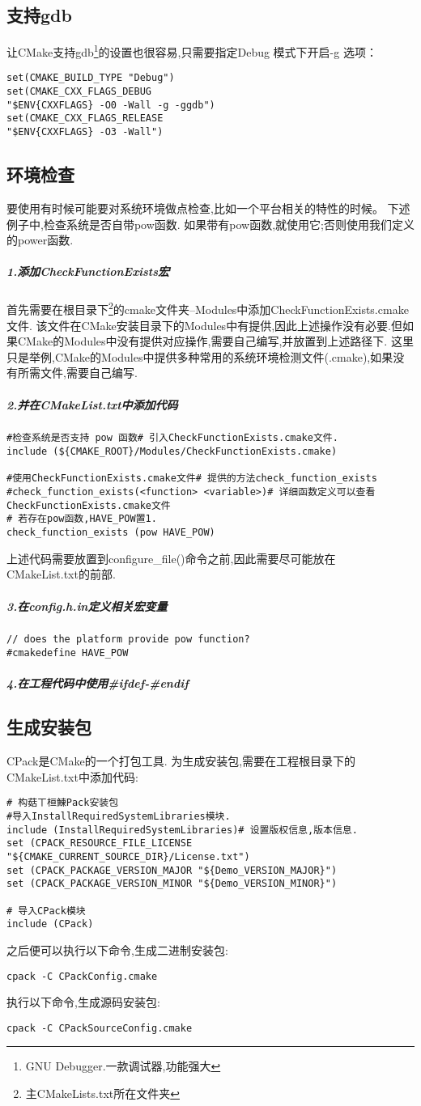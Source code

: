 \documentclass{ctexart}
\begin{document}
\subsection{支持gdb}
让CMake支持gdb\footnote{GNU Debugger.一款调试器,功能强大}的设置也很容易,只需要指定Debug 模式下开启-g 选项：
\begin{verbatim}
set(CMAKE_BUILD_TYPE "Debug")
set(CMAKE_CXX_FLAGS_DEBUG 
"$ENV{CXXFLAGS} -O0 -Wall -g -ggdb")
set(CMAKE_CXX_FLAGS_RELEASE 
"$ENV{CXXFLAGS} -O3 -Wall")
\end{verbatim}
\subsection{环境检查}
要使用有时候可能要对系统环境做点检查,比如一个平台相关的特性的时候。
下述例子中,检查系统是否自带pow函数.
如果带有pow函数,就使用它;否则使用我们定义的power函数.
\subparagraph{1.添加CheckFunctionExists宏}
首先需要在根目录下\footnote{主CMakeLists.txt所在文件夹}的cmake文件夹--Modules中添加CheckFunctionExists.cmake文件.
该文件在CMake安装目录下的Modules中有提供,因此上述操作没有必要.但如果CMake的Modules中没有提供对应操作,需要自己编写,并放置到上述路径下.
这里只是举例,CMake的Modules中提供多种常用的系统环境检测文件(.cmake),如果没有所需文件,需要自己编写.
\subparagraph{2.并在CMakeList.txt中添加代码}
\begin{verbatim}
#检查系统是否支持 pow 函数# 引入CheckFunctionExists.cmake文件.
include (${CMAKE_ROOT}/Modules/CheckFunctionExists.cmake)

#使用CheckFunctionExists.cmake文件# 提供的方法check_function_exists
#check_function_exists(<function> <variable>)# 详细函数定义可以查看CheckFunctionExists.cmake文件
# 若存在pow函数,HAVE_POW置1.
check_function_exists (pow HAVE_POW)
\end{verbatim}
上述代码需要放置到configure\_file()命令之前,因此需要尽可能放在\\CMakeList.txt的前部.
\subparagraph{3.在config.h.in定义相关宏变量}
\begin{verbatim}
// does the platform provide pow function?
#cmakedefine HAVE_POW
\end{verbatim}
\subparagraph{4.在工程代码中使用\#ifdef-\#endif}
\subsection{生成安装包}
CPack是CMake的一个打包工具.
为生成安装包,需要在工程根目录下的CMakeList.txt中添加代码:
\begin{verbatim}
# 构菇ㄒ桓鯟Pack安装包
#导入InstallRequiredSystemLibraries模块.
include (InstallRequiredSystemLibraries)# 设置版权信息,版本信息.
set (CPACK_RESOURCE_FILE_LICENSE
"${CMAKE_CURRENT_SOURCE_DIR}/License.txt")
set (CPACK_PACKAGE_VERSION_MAJOR "${Demo_VERSION_MAJOR}")
set (CPACK_PACKAGE_VERSION_MINOR "${Demo_VERSION_MINOR}")

# 导入CPack模块
include (CPack)
\end{verbatim}
之后便可以执行以下命令,生成二进制安装包:
\begin{verbatim}
cpack -C CPackConfig.cmake
\end{verbatim}
执行以下命令,生成源码安装包:
\begin{verbatim}
cpack -C CPackSourceConfig.cmake
\end{verbatim}
\newpage
\end{document}

